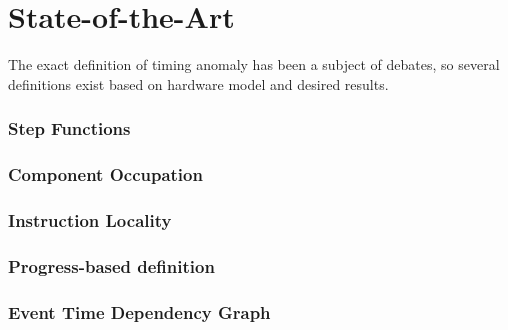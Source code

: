 \chapter{State-of-the-Art}

The exact definition of timing anomaly has been a subject of debates, so several definitions exist based on hardware model and desired results.

\subsection{Step Functions}
\subsection{Component Occupation}
\subsection{Instruction Locality}
\subsection{Progress-based definition}
\subsection{Event Time Dependency Graph}

